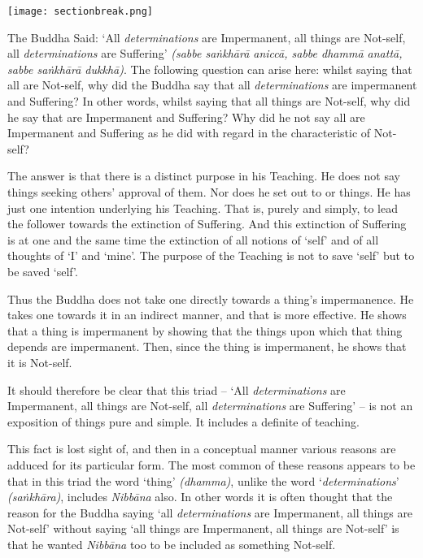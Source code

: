 \texttt{[image: sectionbreak.png]}

The Buddha Said: `All \emph{determinations} are Impermanent, all things are Not-self, all \emph{determinations} are Suffering' \emph{(sabbe saṅkhārā aniccā, sabbe dhammā anattā, sabbe saṅkhārā dukkhā)}. The following question can arise here: whilst saying that all  are Not-self, why did the Buddha say that all \emph{determinations} are impermanent and Suffering? In other words, whilst saying that all things are Not-self, why did he say that  are Impermanent and Suffering? Why did he not  say all  are Impermanent and Suffering as he did with regard in the characteristic of Not-self?

The answer is that there is a distinct purpose in his Teaching. He does not say things seeking others' approval of them. Nor does he set out to  or  things. He has just one intention underlying his Teaching. That is, purely and simply, to lead the follower towards the extinction of Suffering. And this extinction of Suffering is at one and the same time the extinction of all notions of `self' and of all thoughts of `I' and `mine'. The purpose of the Teaching is not to save `self' but to be saved  `self'.

Thus the Buddha does not take one directly towards a thing's impermanence. He takes one towards it in an indirect manner, and that is more effective. He shows that a thing is impermanent by showing that the things upon which that thing depends are impermanent. Then, since the thing is impermanent, he shows that it is Not-self.

It should therefore be clear that this triad -- `All \emph{determinations} are Impermanent, all things are Not-self, all \emph{determinations} are Suffering' -- is not an exposition of things pure and simple. It includes a definite  of teaching.

This fact is lost sight of, and then in a conceptual manner various reasons are adduced for its particular form. The most common of these reasons appears to be that in this triad the word `thing' \emph{(dhamma)}, unlike the word `\emph{determinations}' \emph{(saṅkhāra)}, includes \emph{Nibbāna} also. In other words it is often thought that the reason for the Buddha saying `all \emph{determinations} are Impermanent, all things are Not-self' without saying `all things are Impermanent, all things are Not-self' is that he wanted \emph{Nibbāna} too to be included as something Not-self.

